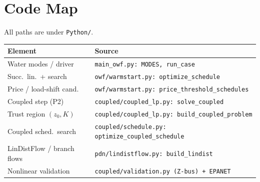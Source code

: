 \documentclass[9pt,twocolumn]{IEEEtran}
\newcommand{\code}[1]{\texttt{\scriptsize #1}}
\begin{document}
\section{Code Map}
All paths are under \code{Python/}.
\begin{table}[h]
\centering\renewcommand{\arraystretch}{1.05}
\begin{tabular}{@{}ll@{}}
\toprule
{\scriptsize Element} & {\scriptsize Source} \\
\midrule
{\scriptsize Water modes / driver}       & \code{main\_owf.py: MODES, run\_case} \\
{\scriptsize Succ.\ lin.\ + search}       & \code{owf/warmstart.py: optimize\_schedule} \\
{\scriptsize Price / load-shift cand.}    & \code{owf/warmstart.py: price\_threshold\_schedules} \\
{\scriptsize Coupled step (P2)}           & \code{coupled/coupled\_lp.py: solve\_coupled} \\
{\scriptsize Trust region $(z_0,K)$}       & \code{coupled/coupled\_lp.py: build\_coupled\_problem} \\
{\scriptsize Coupled sched.\ search}       & \code{coupled/schedule.py: optimize\_coupled\_schedule} \\
{\scriptsize LinDistFlow / branch flows}  & \code{pdn/lindistflow.py: build\_lindist} \\
{\scriptsize Nonlinear validation}        & \code{coupled/validation.py (Z-bus) + EPANET} \\
\bottomrule
\end{tabular}
\end{table}
\end{document}
